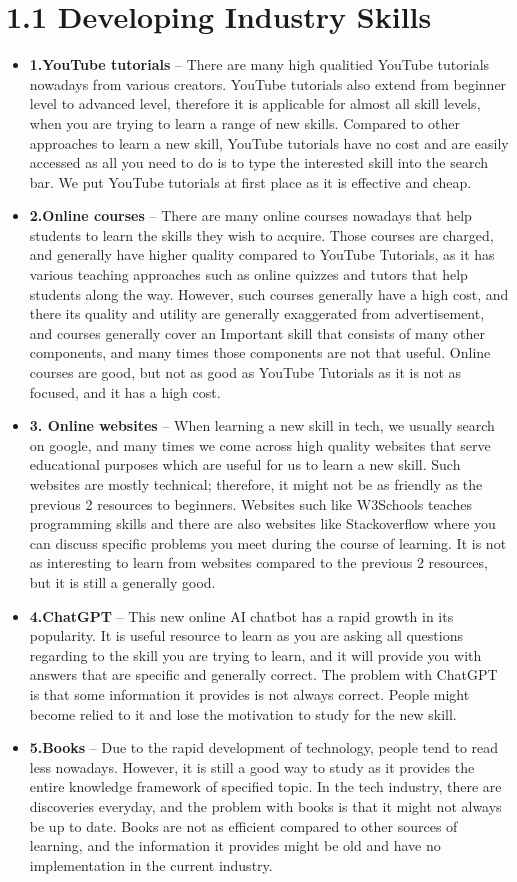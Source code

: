 \documentclass[a4paper, 11pt]{report}
\begin{document}
\section{1.1 Developing Industry Skills}
\begin{itemize}
\item \textbf{1.YouTube tutorials} – There are many high qualitied YouTube tutorials nowadays from various creators. YouTube tutorials also extend from beginner level to advanced level, therefore it is applicable for almost all skill levels, when you are trying to learn a range of new skills. Compared to other approaches to learn a new skill, YouTube tutorials have no cost and are easily accessed as all you need to do is to type the interested skill into the search bar. We put YouTube tutorials at first place as it is effective and cheap.
\item \textbf{2.Online courses} – There are many online courses nowadays that help students to learn the skills they wish to acquire. Those courses are charged, and generally have higher quality compared to YouTube Tutorials, as it has various teaching approaches such as online quizzes and tutors that help students along the way. However, such courses generally have a high cost, and there its quality and utility are generally exaggerated from advertisement, and courses generally cover an Important skill that consists of many other components, and many times those components are not that useful. Online courses are good, but not as good as YouTube Tutorials as it is not as focused, and it has a high cost.
\item \textbf{3. Online websites} – When learning a new skill in tech, we usually search on google, and many times we come across high quality websites that serve educational purposes which are useful for us to learn a new skill. Such websites are mostly technical; therefore, it might not be as friendly as the previous 2 resources to beginners. Websites such like W3Schools teaches programming skills and there are also websites like Stackoverflow where you can discuss specific problems you meet during the course of learning. It is not as interesting to learn from websites compared to the previous 2 resources, but it is still a generally good.
\item \textbf{4.ChatGPT} – This new online AI chatbot has a rapid growth in its popularity. It is useful resource to learn as you are asking all questions regarding to the skill you are trying to learn, and it will provide you with answers that are specific and generally correct. The problem with ChatGPT is that some information it provides is not always correct. People might become relied to it and lose the motivation to study for the new skill.
\item \textbf{5.Books} – Due to the rapid development of technology, people tend to read less nowadays. However, it is still a good way to study as it provides the entire knowledge framework of specified topic. In the tech industry, there are discoveries everyday, and the problem with books is that it might not always be up to date. Books are not as efficient compared to other sources of learning, and the information it provides might be old and have no implementation in the current industry.
\end{itemize}
\end{document}
